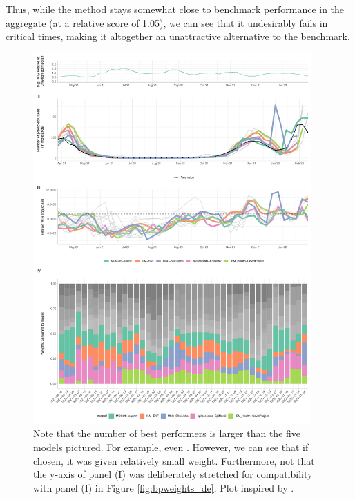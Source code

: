 Thus, while the method stays somewhat close to benchmark performance in the aggregate (at a relative score of 1.05), we can see that it undesirably fails in critical times, making it altogether an unattractive alternative to the benchmark.\\
\begin{figure}
\centering
\includegraphics[width = 0.95\textwidth]{../plots/best_performers_weights_pl}
\caption{Note that the number of best performers is larger than the five models pictured. For example, even . However, we can see that if chosen, it was given relatively small weight. Furthermore, not that the y-axis of panel (I) was deliberately stretched for compatibility with panel (I) in Figure \ref{fig:bpweights_de}. Plot inspired by \cite{ray_comparing_2022}.}
\label{fig:bpweights_pl}
\end{figure}
